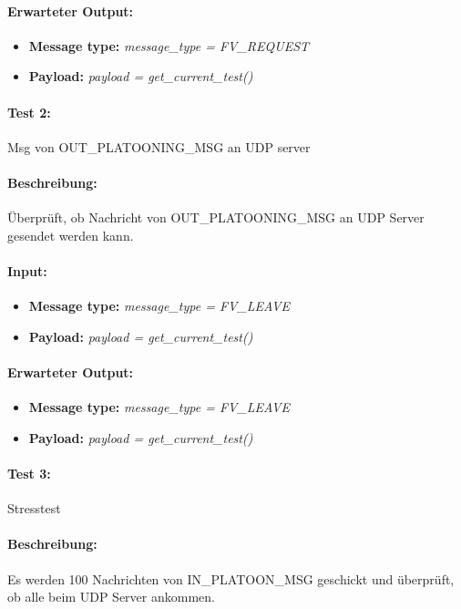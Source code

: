 \documentclass[a4paper, 12pt, titlepage]{scrartcl}
\begin{document}
{			\paragraph{Erwarteter Output:}
			\begin{itemize} \itemsep-0.5em
				\item \textbf{Message type:} \emph{message\_type = FV\_REQUEST}
				\item \textbf{Payload:} \emph{payload = get\_current\_test()}
			\end{itemize}

			\paragraph{Test 2:}{Msg von OUT\_PLATOONING\_MSG an UDP server}
			\paragraph{Beschreibung:} Überprüft, ob Nachricht von OUT\_PLATOONING\_MSG an UDP Server gesendet werden kann.
			\paragraph{Input:}
			\begin{itemize} \itemsep-0.5em
				\item \textbf{Message type:} \emph{message\_type = FV\_LEAVE}
				\item \textbf{Payload:} \emph{payload = get\_current\_test()}
			\end{itemize}
			\paragraph{Erwarteter Output:}
			\begin{itemize} \itemsep-0.5em
				\item \textbf{Message type:} \emph{message\_type = FV\_LEAVE}
				\item \textbf{Payload:} \emph{payload = get\_current\_test()}
			\end{itemize}

			\paragraph{Test 3:}{Stresstest}
			\paragraph{Beschreibung:} Es werden 100 Nachrichten von IN\_PLATOON\_MSG geschickt 	und überprüft, ob alle beim UDP Server ankommen.
}
\end{document}
